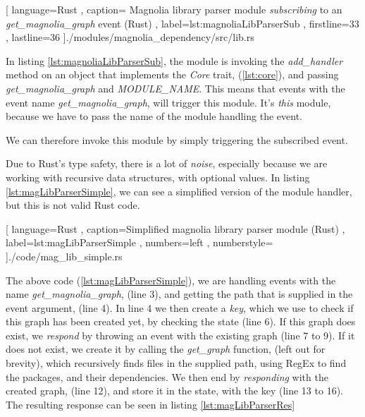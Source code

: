 \begin{center}
  
    [ language=Rust
    , caption={
      Magnolia library parser module \textit{subscribing} to an
      \textit{get\_magnolia\_graph } event (Rust)
    }
    , label=lst:magnoliaLibParserSub
    , firstline=33
    , lastline=36
    ]{./modules/magnolia\_dependency/src/lib.rs}
\end{center}

In listing \ref{lst:magnoliaLibParserSub}, the module is invoking the
\textit{add\_handler} method on an object that implements the \textit{Core} trait,
(\ref{lst:core}), and passing \textit{get\_magnolia\_graph} and
\textit{MODULE\_NAME}. This means that events with the event name
\textit{get\_magnolia\_graph}, will trigger this module. It's \textit{this}
module, because we have to pass the name of the module handling the event.

We can therefore invoke this module by simply triggering the subscribed event.

Due to Rust's type safety, there is a lot of \textit{noise}, especially because
we are working with recursive data structures, with optional values. In listing
\ref{lst:magLibParserSimple}, we can see a simplified version of the module
handler, but this is not valid Rust code.

\begin{code}[H]
  
    [ language=Rust
    , caption={Simplified magnolia library parser module (Rust)}
    , label=lst:magLibParserSimple
    , numbers=left
    , numberstyle=\tiny\color{gray}
    ]{./code/mag\_lib\_simple.rs}
\end{code}

The above code (\ref{lst:magLibParserSimple}), we are handling events with the name
\textit{get\_magnolia\_graph}, (line 3), and getting the path that is supplied in
the event argument, (line 4). In line 4 we then create a \textit{key}, which we
use to check if this graph has been created yet, by checking the state (line 6).
If this graph does exist, we \textit{respond} by throwing an event with the
existing graph (line 7 to 9). If it does not exist, we create it by calling the
\textit{get\_graph} function, (left out for brevity), which recursively finds
files in the supplied path, using RegEx to find the packages, and their
dependencies. We then end by \textit{responding} with the created graph,
(line 12), and store it in the state, with the key (line 13 to 16). The
resulting response can be seen in listing \ref{lst:magLibParserRes}

